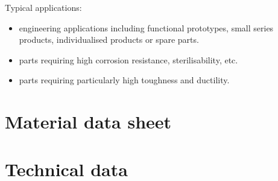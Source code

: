 \documentclass[10pt]{article}
\begin{document}
Typical applications:

\begin{itemize}
  \item engineering applications including functional prototypes, small series products, individualised products or spare parts.
  \item parts requiring high corrosion resistance, sterilisability, etc.
  \item parts requiring particularly high toughness and ductility.
\end{itemize}

\section*{Material data sheet}
\section*{Technical data}
\end{document}
